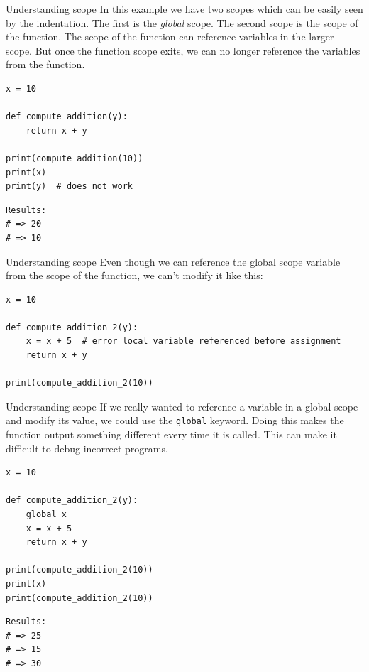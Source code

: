\documentclass[10pt]{beamer}
\begin{document}
\begin{frame}[label={sec:org2b26847},fragile]{Understanding scope}
 In this example we have two scopes which can be easily seen by the indentation. The
first is the \emph{global} scope. The second scope is the scope of the function. The scope
of the function can reference variables in the larger scope. But once the function
scope exits, we can no longer reference the variables from the function.

\begin{verbatim}
x = 10

def compute_addition(y):
    return x + y

print(compute_addition(10))
print(x)
print(y)  # does not work
\end{verbatim}

\begin{verbatim}
Results: 
# => 20
# => 10
\end{verbatim}
\end{frame}

\begin{frame}[label={sec:org572b55d},fragile]{Understanding scope}
 Even though we can reference the global scope variable from the scope of the
function, we can't modify it like this:

\begin{verbatim}
x = 10

def compute_addition_2(y):
    x = x + 5  # error local variable referenced before assignment
    return x + y

print(compute_addition_2(10))
\end{verbatim}
\end{frame}

\begin{frame}[label={sec:orgb5e28e0},fragile]{Understanding scope}
 If we really wanted to reference a variable in a global scope and modify its value,
we could use the \texttt{global} keyword. Doing this makes the
function output something different every time it is called. This can make it
difficult to debug incorrect programs.

\begin{verbatim}
x = 10

def compute_addition_2(y):
    global x
    x = x + 5
    return x + y

print(compute_addition_2(10))
print(x)
print(compute_addition_2(10))
\end{verbatim}

\begin{verbatim}
Results: 
# => 25
# => 15
# => 30
\end{verbatim}
\end{frame}
\end{document}
